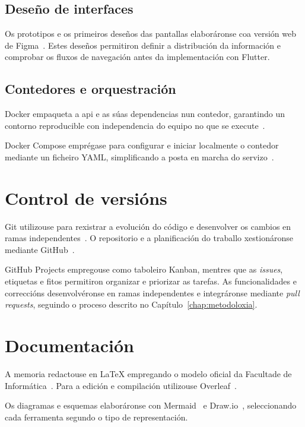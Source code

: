 \subsection{Deseño de interfaces}

Os prototipos e os primeiros deseños das pantallas elaboráronse coa versión web de Figma~\cite{FigmaDesign}. Estes deseños permitiron definir a distribución da información e comprobar os fluxos de navegación antes da implementación con Flutter.

\subsection{Contedores e orquestración}

Docker empaqueta a \gls{api} e as súas dependencias nun contedor, garantindo un contorno reproducible con independencia do equipo no que se execute~\cite{DockerOverview}.

Docker Compose emprégase para configurar e iniciar localmente o contedor mediante un ficheiro YAML, simplificando a posta en marcha do servizo~\cite{DockerCompose}.

\section{Control de versións}

Git utilizouse para rexistrar a evolución do código e desenvolver os cambios en ramas independentes~\cite{GitDocumentation}. O repositorio e a planificación do traballo xestionáronse mediante GitHub~\cite{GitHubPullRequests}.

GitHub Projects empregouse como taboleiro Kanban, mentres que as \textit{issues}, etiquetas e fitos permitiron organizar e priorizar as tarefas. As funcionalidades e correccións desenvolvéronse en ramas independentes e integráronse mediante \textit{pull requests}, seguindo o proceso descrito no Capítulo~\ref{chap:metodoloxia}.

\section{Documentación}

A memoria redactouse en \LaTeX{} empregando o modelo oficial da Facultade de Informática~\cite{LaTeXDocumentation}. Para a edición e compilación utilizouse Overleaf~\cite{OverleafDocumentation}.

Os diagramas e esquemas elaboráronse con Mermaid~\cite{Mermaid} e Draw.io~\cite{Drawio}, seleccionando cada ferramenta segundo o tipo de representación.